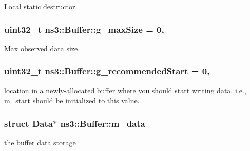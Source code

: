 Local static destructor. 

\subsubsection[{\texorpdfstring{g\+\_\+max\+Size}{g_maxSize}}]{\setlength{\rightskip}{0pt plus 5cm}uint32\+\_\+t ns3\+::\+Buffer\+::g\+\_\+max\+Size = 0\hspace{0.3cm}{\ttfamily [static]}, {\ttfamily [private]}}\hypertarget{classns3_1_1Buffer_a35a9e69b40e97421985973d1a48aab5a}{}\label{classns3_1_1Buffer_a35a9e69b40e97421985973d1a48aab5a}


Max observed data size. 

\subsubsection[{\texorpdfstring{g\+\_\+recommended\+Start}{g_recommendedStart}}]{\setlength{\rightskip}{0pt plus 5cm}uint32\+\_\+t ns3\+::\+Buffer\+::g\+\_\+recommended\+Start = 0\hspace{0.3cm}{\ttfamily [static]}, {\ttfamily [private]}}\hypertarget{classns3_1_1Buffer_a62e14b22a57661cd7e026fea1c79db9e}{}\label{classns3_1_1Buffer_a62e14b22a57661cd7e026fea1c79db9e}
location in a newly-\/allocated buffer where you should start writing data. i.\+e., m\+\_\+start should be initialized to this value. 
\subsubsection[{\texorpdfstring{m\+\_\+data}{m_data}}]{\setlength{\rightskip}{0pt plus 5cm}struct {\bf Data}$\ast$ ns3\+::\+Buffer\+::m\+\_\+data\hspace{0.3cm}{\ttfamily [private]}}\hypertarget{classns3_1_1Buffer_aad1ff41b0403829d7aadfef80783484d}{}\label{classns3_1_1Buffer_aad1ff41b0403829d7aadfef80783484d}


the buffer data storage 

